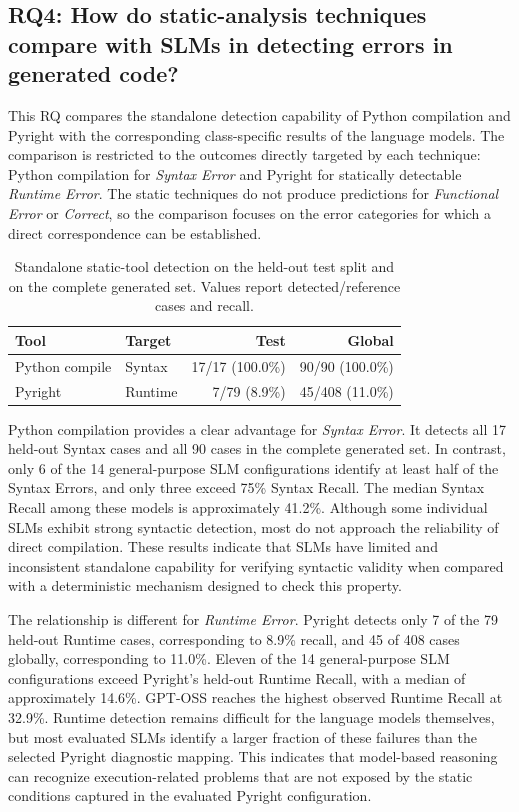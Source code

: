 \subsection{RQ4: How do static-analysis techniques compare with SLMs in detecting errors in generated code?}
\label{sec:rq4}

This RQ compares the standalone detection capability of Python compilation and Pyright with the corresponding class-specific results of the language models. The comparison is restricted to the outcomes directly targeted by each technique: Python compilation for \emph{Syntax Error} and Pyright for statically detectable \emph{Runtime Error}. The static techniques do not produce predictions for \emph{Functional Error} or \emph{Correct}, so the comparison focuses on the error categories for which a direct correspondence can be established.

\begin{table}[htbp]
\centering
\caption{Standalone static-tool detection on the held-out test split and on the complete generated set. Values report detected/reference cases and recall.}
\label{tab:rq4_tools}
\begin{tabular}{llrr}
\toprule
\textbf{Tool} & \textbf{Target} & \textbf{Test} & \textbf{Global} \\
\midrule
Python compile & Syntax & 17/17 (100.0\%) & 90/90 (100.0\%) \\
Pyright & Runtime & 7/79 (8.9\%) & 45/408 (11.0\%) \\
\bottomrule
\end{tabular}
\end{table}

Python compilation provides a clear advantage for \emph{Syntax Error}. It detects all 17 held-out Syntax cases and all 90 cases in the complete generated set. In contrast, only 6 of the 14 general-purpose SLM configurations identify at least half of the Syntax Errors, and only three exceed 75\% Syntax Recall. The median Syntax Recall among these models is approximately 41.2\%. Although some individual SLMs exhibit strong syntactic detection, most do not approach the reliability of direct compilation. These results indicate that SLMs have limited and inconsistent standalone capability for verifying syntactic validity when compared with a deterministic mechanism designed to check this property.

The relationship is different for \emph{Runtime Error}. Pyright detects only 7 of the 79 held-out Runtime cases, corresponding to 8.9\% recall, and 45 of 408 cases globally, corresponding to 11.0\%. Eleven of the 14 general-purpose SLM configurations exceed Pyright's held-out Runtime Recall, with a median of approximately 14.6\%. GPT-OSS reaches the highest observed Runtime Recall at 32.9\%. Runtime detection remains difficult for the language models themselves, but most evaluated SLMs identify a larger fraction of these failures than the selected Pyright diagnostic mapping. This indicates that model-based reasoning can recognize execution-related problems that are not exposed by the static conditions captured in the evaluated Pyright configuration.

